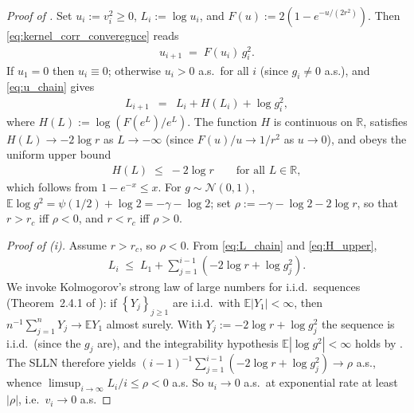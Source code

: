 \documentclass{article}
\newcommand{\RR}{\mathbb{R}}
\newcommand{\Set}[1]{\left\{ #1 \right\}}
\newcommand{\Brack}[1]{\left( #1 \right)}
\newcommand{\Exp}[1]{\mathbb{E} #1}
\newcommand{\mcN}{\mathcal{N}}
\begin{document}
\begin{proof}[Proof of ]
  Set $u_i := v_i^2 \ge 0$, $L_i := \log u_i$, and $F(u) := 2(1 - e^{-u/(2r^2)})$. Then \eqref{eq:kernel_corr_converegnce} reads
  \begin{eqnarray}
    \label{eq:u_chain}
    u_{i+1} \;=\; F(u_i)\,g_i^2.
  \end{eqnarray}
  If $u_1 = 0$ then $u_i \equiv 0$; otherwise $u_i > 0$ a.s.\ for all $i$ (since $g_i \ne 0$ a.s.), and \eqref{eq:u_chain} gives
  \begin{eqnarray}
    \label{eq:L_chain}
    L_{i+1} & = & L_i + H(L_i) + \log g_i^2,
  \end{eqnarray}
  where $H(L) := \log\Brack{F(e^L)/e^L}$.
  The function $H$ is continuous on $\RR$, satisfies $H(L) \to -2\log r$ as $L \to -\infty$ (since $F(u)/u \to 1/r^2$ as $u \to 0$), and obeys the uniform upper bound
  \begin{eqnarray}
    \label{eq:H_upper}
    H(L) \;\le\; -2\log r \qquad \text{for all } L \in \RR,
  \end{eqnarray}
  which follows from $1 - e^{-x} \le x$. For $g \sim \mcN(0,1)$, $\Exp{\log g^2} = \psi(1/2) + \log 2 = -\gamma - \log 2$; set $\rho := -\gamma - \log 2 - 2\log r$, so that $r > r_c$ iff $\rho < 0$, and $r < r_c$ iff $\rho > 0$.

  \emph{Proof of (i).} Assume $r > r_c$, so $\rho < 0$. From \eqref{eq:L_chain} and \eqref{eq:H_upper},
  \begin{eqnarray*}
    L_i \;\le\; L_1 + \sum_{j=1}^{i-1}\Brack{-2\log r + \log g_j^2}.
  \end{eqnarray*}
  We invoke Kolmogorov's strong law of large numbers for i.i.d.\ sequences (Theorem~2.4.1 of \cite{durrett2019probability}): if $\Set{Y_j}_{j \ge 1}$ are i.i.d.\ with $\Exp{|Y_1|} < \infty$, then $n^{-1}\sum_{j=1}^n Y_j \to \Exp{Y_1}$ almost surely. With $Y_j := -2\log r + \log g_j^2$ the sequence is i.i.d.\ (since the $g_j$ are), and the integrability hypothesis $\Exp{|\log g^2|} < \infty$ holds by . The SLLN therefore yields $(i-1)^{-1}\sum_{j=1}^{i-1}(-2\log r + \log g_j^2) \to \rho$ a.s., whence $\limsup_{i\to\infty} L_i/i \le \rho < 0$ a.s. So $u_i \to 0$ a.s.\ at exponential rate at least $|\rho|$, i.e.\ $v_i \to 0$ a.s.


\end{proof}
\end{document}

